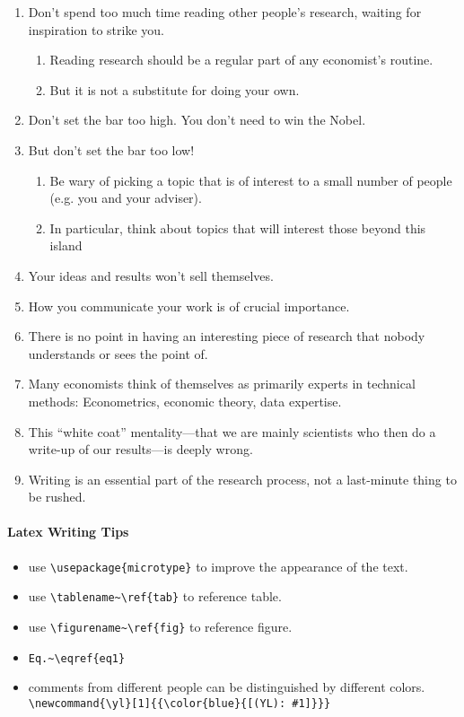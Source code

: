 \begin{enumerate}
	\item  Don’t spend too much time reading other people’s research, waiting for inspiration to strike you.
	      \begin{enumerate}
		      \item  Reading research should be a regular part of any economist’s routine.
		      \item But it is not a substitute for doing your own.
	      \end{enumerate}

	\item Don’t set the bar too high. You don’t need to win the Nobel.
	\item  But don’t set the bar too low!
	      \begin{enumerate}
		      \item Be wary of picking a topic that is of interest to a small number of people (e.g. you and your adviser).
		      \item In particular, think about topics that will interest those beyond this island
	      \end{enumerate}
	\item Your ideas and results won’t sell themselves.
	\item How you communicate your work is of crucial importance.
	\item There is no point in having an interesting piece of research that nobody understands or sees the point of.
	\item Many economists think of themselves as primarily experts in technical methods: Econometrics, economic theory, data expertise.
	\item This “white coat” mentality—that we are mainly scientists who then do a write-up of our results—is deeply wrong.
	\item Writing is an essential part of the research process, not a last-minute thing to be rushed.
\end{enumerate}

\paragraph{Latex Writing Tips}

\begin{itemize}
	\item use \verb|\usepackage{microtype}| to improve the appearance of the text.
	\item use \verb|\tablename~\ref{tab}| to reference table.
	\item use \verb|\figurename~\ref{fig}| to reference figure.
	\item \verb|Eq.~\eqref{eq1}|
	\item comments from different people can be distinguished by different colors. \verb|\newcommand{\yl}[1]{{\color{blue}{[(YL): #1]}}}|
\end{itemize}

